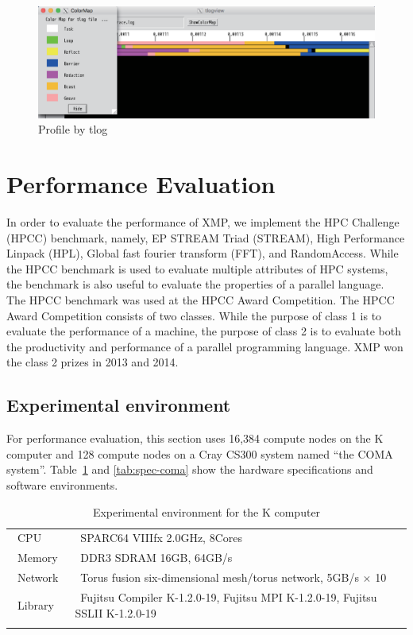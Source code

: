 \documentclass[graybox]{svmult}
\begin{document}
\begin{figure}[h]
\sidecaption
\includegraphics[scale=.365]{img/tlog.eps}
\caption{Profile by tlog\cite{omni}} \label{fig:tlog}
\end{figure}
\section{Performance Evaluation}
In order to evaluate the performance of XMP,
we implement the HPC Challenge (HPCC) benchmark\cite{hpcc}, namely, 
EP STREAM Triad (STREAM), High Performance Linpack (HPL), Global fast fourier transform (FFT), and RandomAccess\cite{hpca}.
While the HPCC benchmark is used to evaluate multiple attributes of HPC systems, 
the benchmark is also useful to evaluate the properties of a parallel language.
The HPCC benchmark was used at the HPCC Award Competition\cite{hpcc-a}. 
The HPCC Award Competition consists of two classes. 
While the purpose of class 1 is to evaluate the performance of a machine, 
the purpose of class 2 is to evaluate both the productivity and performance of a parallel programming language.
XMP won the class 2 prizes in 2013 and 2014.

\subsection{Experimental environment}
For performance evaluation, 
this section uses 16,384 compute nodes on the K computer and 128 compute nodes on a Cray CS300 system named ``the COMA system''.
Table~\ref{tab:spec-k} and \ref{tab:spec-coma} show the hardware specifications and software environments. 

\begin{table}[h]
\caption{Experimental environment for the K computer}\label{tab:spec-k}
\begin{tabular}{l|l}
\hline\noalign{\smallskip}
~CPU~        & ~SPARC64 VIIIfx 2.0GHz, 8Cores \\
~Memory~  & ~DDR3 SDRAM 16GB, 64GB/s \\
~Network~  & ~Torus fusion six-dimensional mesh/torus network, 5GB/s $\times$ 10 \\
~Library~    & ~Fujitsu Compiler K-1.2.0-19, Fujitsu MPI K-1.2.0-19, Fujitsu SSLII K-1.2.0-19\\
\noalign{\smallskip}\hline\noalign{\smallskip}
\end{tabular}
\end{table}
\end{document}

